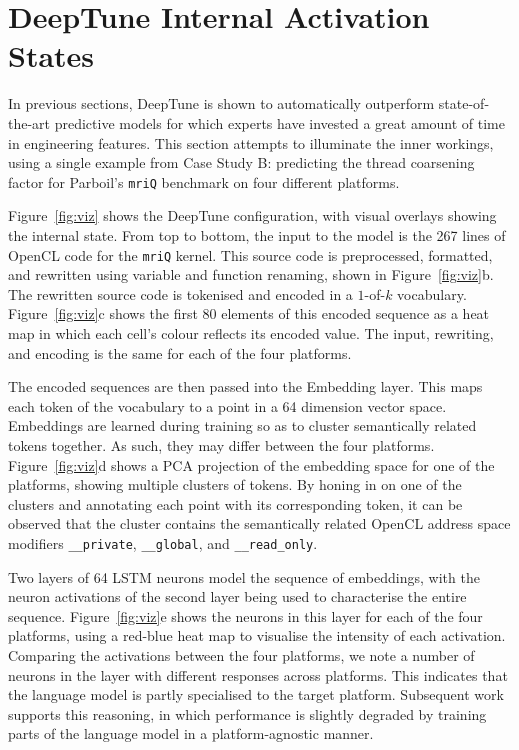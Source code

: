 \section{DeepTune Internal Activation States}
\label{sec:deeptune-internal-states}

In previous sections, DeepTune is shown to automatically outperform state-of-the-art predictive models for which experts have invested a great amount of time in engineering features. This section attempts to illuminate the inner workings, using a single example from Case Study B: predicting the thread coarsening factor for Parboil's \texttt{mriQ} benchmark on four different platforms.

Figure~\ref{fig:viz} shows the DeepTune configuration, with visual overlays showing the internal state. From top to bottom, the input to the model is the 267 lines of OpenCL code for the \texttt{mriQ} kernel. This source code is preprocessed, formatted, and rewritten using variable and function renaming, shown in Figure~\ref{fig:viz}b. The rewritten source code is tokenised and encoded in a $1$-of-$k$ vocabulary. Figure~\ref{fig:viz}c shows the first 80 elements of this encoded sequence as a heat map in which each cell's colour reflects its encoded value. The input, rewriting, and encoding is the same for each of the four platforms.



The encoded sequences are then passed into the Embedding layer. This maps each token of the vocabulary to a point in a 64 dimension vector space. Embeddings are learned during training so as to cluster semantically related tokens together. As such, they may differ between the four platforms. Figure~\ref{fig:viz}d shows a PCA projection of the embedding space for one of the platforms, showing multiple clusters of tokens. By honing in on one of the clusters and annotating each point with its corresponding token, it can be observed that the cluster contains the semantically related OpenCL address space modifiers \texttt{\_\_private}, \texttt{\_\_global}, and \texttt{\_\_read\_only}.

Two layers of 64 LSTM neurons model the sequence of embeddings, with the neuron activations of the second layer being used to characterise the entire sequence. Figure~\ref{fig:viz}e shows the neurons in this layer for each of the four platforms, using a red-blue heat map to visualise the intensity of each activation. Comparing the activations between the four platforms, we note a number of neurons in the layer with different responses across platforms. This indicates that the language model is partly specialised to the target platform. Subsequent work~\cite{Ben-nun2018} supports this reasoning, in which performance is slightly degraded by training parts of the language model in a platform-agnostic manner.

